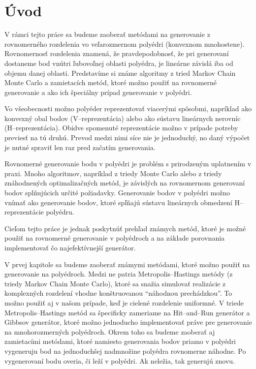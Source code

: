 \chapter*{Úvod} %

V rámci tejto práce sa budeme zaoberať metódami na generovanie z rovnomerného rozdelenia vo veľarozmernom polyédri (konvexnom mnohostene). Rovnomernosť rozdelenia znamená, že pravdepodobnosť, že pri generovaní dostaneme bod vnútri ľubovoľnej oblasti polyédra, je lineárne závislá iba od objemu danej oblasti. Predstavíme si známe algoritmy z tried Markov Chain Monte Carlo a zamietacích metód, ktoré možno použiť na rovnomerné generovanie a ako ich špeciálny prípad generovanie v polyédri. 

Vo všeobecnosti možno polyéder reprezentovať viacerými spôsobmi, napríklad ako konvexný obal bodov (V--reprezentácia) alebo ako sústavu lineárnych nerovníc (H--reprezentácia). Obidve spomenuté reprezentácie možno v prípade potreby previesť na tú druhú. Prevod medzi nimi síce nie je jednoduchý, no daný výpočet je nutné spraviť len raz pred začatím generovania. 

Rovnomerné generovanie bodu v polyédri je problém s prirodzeným uplatnením v praxi. Mnoho algoritmov, napríklad z triedy Monte Carlo alebo z triedy znáhodnených optimalizačných metód, je závislých na rovnomernom generovaní bodov splňujúcich určité požiadavky.
Generovanie bodov v polyédri možno vnímať ako generovanie bodov, ktoré spľňajú sústavu lineárnych obmedzení H--reprezentácie polyédru.

Cieľom tejto práce je jednak poskytnúť prehľad známych metód, ktoré je možné použiť na rovnomerné generovanie v polyédroch a na základe porovnania implementovať čo najefektívnejší generátor.

V prvej kapitole sa budeme zaoberať známymi metódami, ktoré možno použiť na generovanie na polyédroch. Medzi ne patria Metropolis--Hastings metódy (z triedy Markov Chain Monte Carlo), ktoré sa snažia simulovať realizácie z komplexných rozdelení vhodne konštruovanou ``náhodnou prechádzkou''. To možno použiť aj v našom prípade, keď je cielené rozdelenie uniformné. V triede Metropolis--Hastings metód sa špecificky zameriame na Hit--and--Run generátor a Gibbsov generátor, ktoré možno jednoducho implementovať práve pre generovanie na mnohorozmerných polyédroch.
Okrem toho sa budeme zaoberať aj zamietacími metódami, ktoré namiesto generovania bodov priamo v polyédri vygeneruju bod na jednoduchšej nadmnožine polyédra rovnomerne náhodne. Po vygenerovaní bodu overia, či leží v polyédri. Ak neležia, tak generujú znovu.

